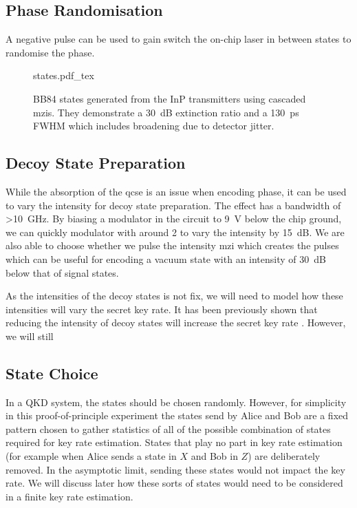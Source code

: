 \subsection{Phase Randomisation}

A negative pulse can be used to gain switch the on-chip laser in between states to randomise the phase. 

\begin{figure}[tbp]
	\centering
	\small
	\def\svgwidth{\textwidth} 
	{states.pdf_tex}
	\caption[BB84 states generated from the InP transmitters]{BB84 states generated from the InP transmitters using cascaded \acp{mzi}. They demonstrate a \SI{30}{dB} extinction ratio and a \SI{130}{\ps} \ac{FWHM} which includes broadening due to detector jitter.}
	\label{fig:states}
\end{figure}

\subsection{Decoy State Preparation}

While the absorption of the \ac{qcse} is an issue when encoding phase, it can be used to vary the intensity for decoy state preparation. The effect has a bandwidth of \SI{>10}{\GHz}. By biasing a modulator in the circuit to \SI{9}{\V} below the chip ground, we can quickly modulator with around \SI{2}{\Vpp} to vary the intensity by \SI{15}{dB}. We are also able to choose whether we pulse the intensity \ac{mzi} which creates the pulses which can be useful for encoding a vacuum state with an intensity of \SI{30}{dB} below that of signal states.

As the intensities of the decoy states is not fix, we will need to model how these intensities will vary the secret key rate. It has been previously shown that reducing the intensity of decoy states will increase the secret key rate \cite{Chan2014}. However, we will still 

\subsection{State Choice}

In a \ac{QKD} system, the states should be chosen randomly. However, for simplicity in this proof-of-principle experiment the states send by Alice and Bob are a fixed pattern chosen to gather statistics of all of the possible combination of states required for key rate estimation. States that play no part in key rate estimation (for example when Alice sends a state in $X$ and Bob in $Z$) are deliberately removed. In the asymptotic limit, sending these states would not impact the key rate. We will discuss later how these sorts of states would need to be considered in a finite key rate estimation.

